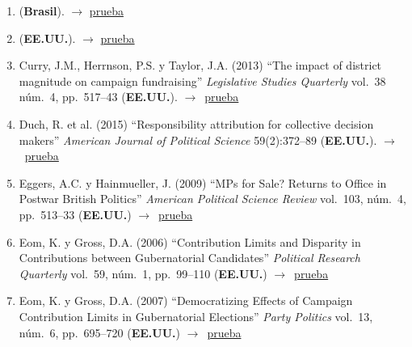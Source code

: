 \documentclass[12 pt, letter]{article}
\newenvironment{CitasMiTrabajo}{
    \begin{footnotesize}
    \begin{enumerate}[label={\footnotesize\emph{cita~\arabic*}},ref=\arabic*] %
        \setlength{\itemsep}{.1\itemsep}
        \setlength{\parskip}{.1\parskip}
    }{\end{enumerate}\end{footnotesize}}
\begin{document}
\begin{CitasMiTrabajo}
        \item {} (\textbf{Brasil}). $\rightarrow$ \href{https://github.com/emagar/cv/blob/master/citasMiTrab/coxMagar/castroAccountBrasil2014opPub.pdf}{prueba}

       \item {} (\textbf{EE.UU.}).  $\rightarrow$ \href{https://www.semanticscholar.org/paper/Earmarks-and-Subcommittee-Government-in-the-U.S.-Clemens-Crespin/b68f98a353ceca61ac12fc0ace04a09982314050}{prueba}
         
        \item Curry, J.M., Herrnson, P.S. y Taylor, J.A. (2013)
        ``The impact of district magnitude on campaign fundraising''
        \emph{Legislative Studies Quarterly} vol.\ 38 n\'um.\ 4, pp.\ 517--43 (\textbf{EE.UU.}). $\rightarrow$~\href{https://github.com/emagar/cv/blob/master/citasMiTrab/coxMagar/curryEtAl2013lsq.excerpts.pdf}{prueba}

        \item Duch, R. et al. (2015) ``Responsibility attribution for collective decision makers'' \emph{American Journal of Political Science} 59(2):372--89 (\textbf{EE.UU.}). $\rightarrow$~\href{https://github.com/emagar/cv/blob/master/citasMiTrab/coxMagar/duch.etalAttribution2015ajps.pdf}{prueba}

        \item Eggers, A.C. y Hainmueller, J. (2009)
        ``MPs for Sale? Returns to Office in Postwar British Politics''
        \emph{American Political Science Review} vol.\ 103, n\'um.\ 4, pp.\ 513--33  (\textbf{EE.UU.}) $\rightarrow$~\href{https://github.com/emagar/cv/blob/master/citasMiTrab/coxMagar/eggers.pdf}{prueba}

        \item Eom, K. y Gross, D.A. (2006)
        ``Contribution Limits and Disparity in Contributions between
        Gubernatorial Candidates'' \emph{Political Research Quarterly} vol.\ 59, n\'um.\
        1, pp.\ 99--110  (\textbf{EE.UU.}) $\rightarrow$~\href{https://github.com/emagar/cv/blob/master/citasMiTrab/coxMagar/eom1.pdf}{prueba}

        \item Eom, K. y Gross, D.A. (2007)
        ``Democratizing Effects of Campaign Contribution Limits in Gubernatorial Elections'' \emph{Party Politics} vol.\ 13, n\'um.\ 6, pp.\ 695--720
        (\textbf{EE.UU.}) $\rightarrow$~\href{https://github.com/emagar/cv/blob/master/citasMiTrab/coxMagar/eom2.pdf}{prueba}


\end{CitasMiTrabajo}
\end{document}
